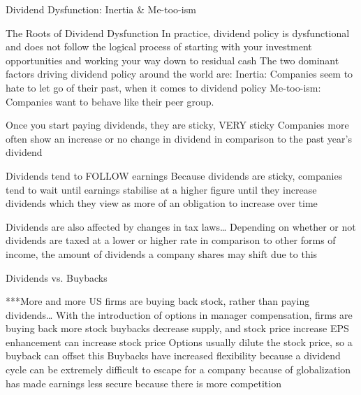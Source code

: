 \documentclass[10pt]{article}
\begin{document}
    \begin{core}{Dividend Dysfunction: Inertia \& Me-too-ism}

      The Roots of Dividend Dysfunction
      In practice, dividend policy is dysfunctional and does not follow the logical process of starting with your investment opportunities and working your way down to residual cash
      The two dominant factors driving dividend policy around the world are:
      Inertia: Companies seem to hate to let go of their past, when it comes to dividend policy
      Me-too-ism: Companies want to behave like their peer group.

      Once you start paying dividends, they are sticky, VERY sticky
      Companies more often show an increase or no change in dividend in comparison to the past year’s dividend

      Dividends tend to FOLLOW earnings
      Because dividends are sticky, companies tend to wait until earnings stabilise at a higher figure until they increase dividends which they view as more of an obligation to increase over time

      Dividends are also affected by changes in tax laws…
      Depending on whether or not dividends are taxed at a lower or higher rate in comparison to other forms of income, the amount of dividends a company shares may shift due to this

    \end{core}

    \begin{core}{Dividends vs. Buybacks}

      ***More and more US firms are buying back stock, rather than paying dividends…
      With the introduction of options in manager compensation, firms are buying back more stock
      buybacks decrease supply, and stock price increase
      EPS enhancement can increase stock price
      Options usually dilute the stock price, so a buyback can offset this
      Buybacks have increased flexibility because a dividend cycle can be extremely difficult to escape for a company because of 
      globalization has made earnings less secure because there is more competition

    \end{core}
\end{document}
